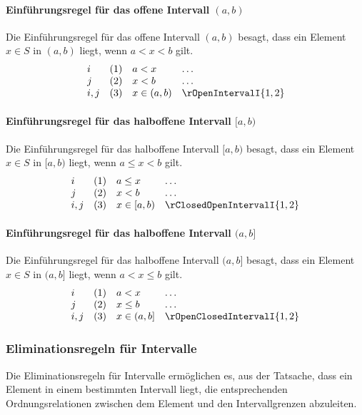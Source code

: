 \documentclass[main.tex]{subfiles}
\begin{document}
\paragraph{Einführungsregel für das offene Intervall \((a, b)\)}
Die Einführungsregel für das offene Intervall \((a, b)\) besagt, dass ein Element \(x \in S\) in \((a, b)\) liegt, wenn \(a < x < b\) gilt.
\[
\begin{array}{llll}
    i   & (1) & a < x & \dots \\
    j   & (2) & x < b & \dots \\
    i,j & (3) & x \in (a, b) & \rOpenIntervalI{1,2}
\end{array}
\]

\paragraph{Einführungsregel für das halboffene Intervall \([a, b)\)}
Die Einführungsregel für das halboffene Intervall \([a, b)\) besagt, dass ein Element \(x \in S\) in \([a, b)\) liegt, wenn \(a \leq x < b\) gilt.
\[
\begin{array}{llll}
    i   & (1) & a \leq x & \dots \\
    j   & (2) & x < b & \dots \\
    i,j & (3) & x \in [a, b) & \rClosedOpenIntervalI{1,2}
\end{array}
\]

\paragraph{Einführungsregel für das halboffene Intervall \((a, b]\)}
Die Einführungsregel für das halboffene Intervall \((a, b]\) besagt, dass ein Element \(x \in S\) in \((a, b]\) liegt, wenn \(a < x \leq b\) gilt.
\[
\begin{array}{llll}
    i   & (1) & a < x & \dots \\
    j   & (2) & x \leq b & \dots \\
    i,j & (3) & x \in (a, b] & \rOpenClosedIntervalI{1,2}
\end{array}
\]

\subsubsection{Eliminationsregeln für Intervalle}
\label{rule:rClosedIntervalE} \label{rule:rOpenIntervalE} \label{rule:rClosedOpenIntervalE} \label{rule:rOpenClosedIntervalE}

Die Eliminationsregeln für Intervalle ermöglichen es, aus der Tatsache, dass ein Element in einem bestimmten Intervall liegt, die entsprechenden Ordnungsrelationen zwischen dem Element und den Intervallgrenzen abzuleiten.
\end{document}
